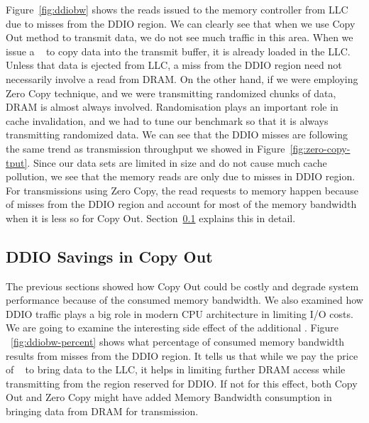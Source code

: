 Figure~\ref{fig:ddiobw} shows the reads issued to the memory controller from LLC due to misses from the  DDIO region. We can clearly see that when we use Copy Out 
method to transmit data, we do not see much traffic in this area. When we issue a \memcpy~ to copy data into the transmit buffer, it is already loaded in the LLC. 
Unless that data is ejected from LLC, a miss from the DDIO region need not necessarily involve a read from DRAM. On the other hand, if we were employing Zero Copy technique, 
and we were transmitting randomized chunks of data, DRAM is almost always involved. Randomisation plays an important role in cache invalidation,
 and we had to tune our benchmark so that it is always transmitting randomized data. 
We can see that the DDIO misses are following the same trend as transmission throughput we showed in Figure~\ref{fig:zero-copy-tput}. 
Since our data sets are limited in size and do not cause much cache pollution, we see that the 
memory reads are only due to misses in DDIO region. For transmissions using Zero Copy, 
the read requests to memory happen because of misses from the DDIO region and account for 
most of the memory bandwidth when it is less so for Copy Out. Section~\ref{sec:ddiobw-savings} explains this in detail.
\newline



\subsection{DDIO Savings in Copy Out}
\label{sec:ddiobw-savings}
The previous sections showed how Copy Out could be costly and degrade system performance 
because of the consumed memory bandwidth. We also examined how DDIO traffic plays a big role 
in modern CPU architecture in limiting I/O costs. We are going to examine the 
interesting side effect of the additional \memcpy. Figure ~\ref{fig:ddiobw-percent} shows what percentage of consumed 
memory bandwidth results from misses from the DDIO region. It tells us that while 
we pay the price of \memcpy~ to bring data to the LLC, it helps in limiting further DRAM access while transmitting 
from the region reserved for DDIO. If not for this effect, both Copy Out and Zero Copy 
might have added Memory Bandwidth consumption in bringing data from DRAM for transmission. 



